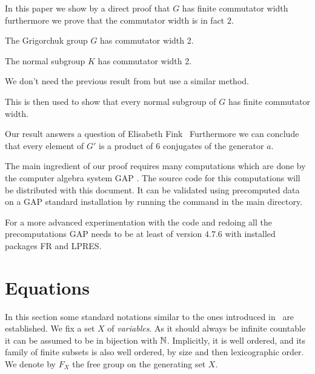 \documentclass[a4paper,11pt]{amsart}
\begin{document}
In this paper we show by a direct proof that $G$ has finite commutator width 
furthermore we prove that the commutator width is in fact $2$.
\begin{thm}\label{thm:CWGrigorchukGroup}
 The Grigorchuk group $G$ has commutator width 2.
 
 The normal subgroup $K$ has commutator width 2.
\end{thm}
We don't need the previous result from \cite{Lysenok:QudraticEquationsInGrig}
but use a similar method.

This is then used to show that every normal subgroup of $G$ has
finite commutator width.

Our result answers a question of Elisabeth Fink~\cite[Question 3]{Fink:Conjugacy_growth}
Furthermore we can conclude that every element of $G'$ is a product of 
$6$ conjugates of the generator $a$.

The main ingredient of our proof requires many computations which are 
done by the computer algebra system GAP \cite{GAP4}. The source code
for this computations will be distributed with this document. It can
be validated using precomputed data on a GAP standard installation
by running the command  in the main directory.

For a more advanced experimentation with the code and redoing all 
the precomputations GAP needs to be at least of version $4.7.6$ 
with installed packages FR\cite{FR2.3.6} and 
LPRES. %

\section{Equations}
In this section some standard notations similar to the ones introduced
in~\cite{ComerfordEquationsFreeGroups} are established. We fix a set
$X$ of \emph{variables}. As it should always be infinite countable it
can be assumed to be in bijection with $\mathbb{N}$. Implicitly, it is well
ordered, and its family of finite subsets is also well ordered, by
size and then lexicographic order. We denote by $F_X$ the free group
on the generating set $X$.
\end{document}
